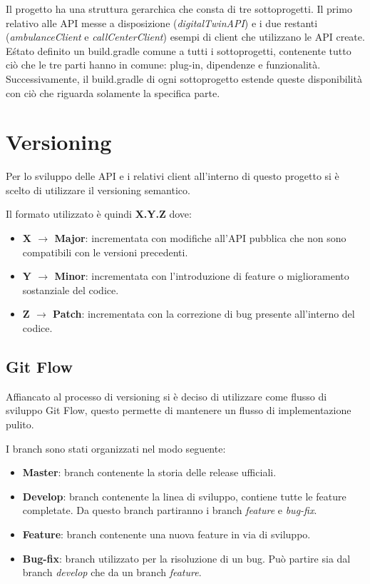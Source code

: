 \documentclass[12pt]{article}
\begin{document}
Il progetto ha una struttura gerarchica che consta di tre sottoprogetti. Il primo relativo alle API messe a disposizione (\textit{digitalTwinAPI}) e i due restanti (\textit{ambulanceClient} e \textit{callCenterClient}) esempi di client che utilizzano le API create.
E\' stato definito un build.gradle comune a tutti i sottoprogetti, contenente tutto ciò che le tre parti hanno in comune: plug-in, dipendenze e funzionalità. Successivamente, il build.gradle di ogni sottoprogetto estende queste disponibilità con ciò che riguarda solamente la specifica parte.

\section{Versioning}
Per lo sviluppo delle API e i relativi client all'interno di questo progetto si è scelto di utilizzare il versioning semantico.

Il formato utilizzato è quindi \textbf{X.Y.Z} dove:
\begin{itemize}
    \item \textbf{X $\rightarrow$ Major}: incrementata con modifiche all'API pubblica che non sono compatibili con le versioni precedenti.
    \item \textbf{Y $\rightarrow$ Minor}: incrementata con l'introduzione di feature o miglioramento sostanziale del codice.
    \item \textbf{Z $\rightarrow$ Patch}: incrementata con la correzione di bug presente all'interno del codice.
\end{itemize}

\subsection{Git Flow}
Affiancato al processo di versioning si è deciso di utilizzare come flusso di sviluppo Git Flow, questo permette di mantenere un flusso di implementazione pulito.

I branch sono stati organizzati nel modo seguente:
\begin{itemize}
    \item \textbf{Master}: branch contenente la storia delle release ufficiali.
    \item \textbf{Develop}: branch contenente la linea di sviluppo, contiene tutte le feature completate. Da questo branch partiranno i branch \textit{feature} e \textit{bug-fix}.
    \item \textbf{Feature}: branch contenente una nuova feature in via di sviluppo. 
    \item \textbf{Bug-fix}: branch utilizzato per la risoluzione di un bug. Può partire sia dal branch \textit{develop} che da un branch \textit{feature}.
\end{itemize}
\end{document}
